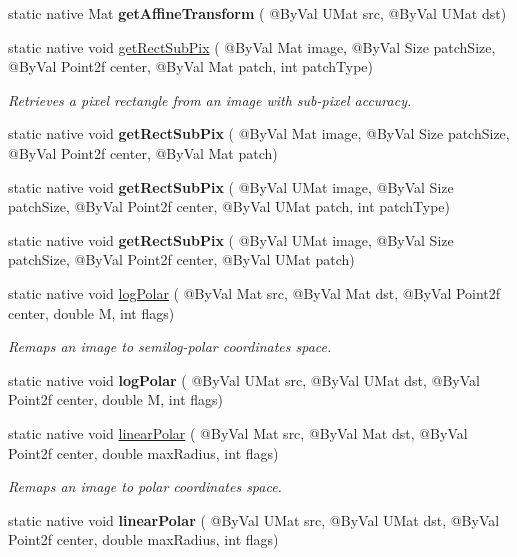 \begin{DoxyCompactItemize}
\item 
static native Mat {\bfseries get\+Affine\+Transform} ( @By\+Val U\+Mat src, @By\+Val U\+Mat dst)
\item 
static native void \hyperlink{group__imgproc__transform_gae176a226575415412c0b6ea67126e54e}{get\+Rect\+Sub\+Pix} ( @By\+Val Mat image, @By\+Val Size patch\+Size, @By\+Val Point2f center, @By\+Val Mat patch, int patch\+Type)
\begin{DoxyCompactList}\small\item\em Retrieves a pixel rectangle from an image with sub-\/pixel accuracy. \end{DoxyCompactList}\item 
static native void {\bfseries get\+Rect\+Sub\+Pix} ( @By\+Val Mat image, @By\+Val Size patch\+Size, @By\+Val Point2f center, @By\+Val Mat patch)
\item 
static native void {\bfseries get\+Rect\+Sub\+Pix} ( @By\+Val U\+Mat image, @By\+Val Size patch\+Size, @By\+Val Point2f center, @By\+Val U\+Mat patch, int patch\+Type)
\item 
static native void {\bfseries get\+Rect\+Sub\+Pix} ( @By\+Val U\+Mat image, @By\+Val Size patch\+Size, @By\+Val Point2f center, @By\+Val U\+Mat patch)
\item 
static native void \hyperlink{group__imgproc__transform_ga525e11d8b35ba086ca22b5ea9307c6a7}{log\+Polar} ( @By\+Val Mat src, @By\+Val Mat dst, @By\+Val Point2f center, double M, int flags)
\begin{DoxyCompactList}\small\item\em Remaps an image to semilog-\/polar coordinates space. \end{DoxyCompactList}\item 
static native void {\bfseries log\+Polar} ( @By\+Val U\+Mat src, @By\+Val U\+Mat dst, @By\+Val Point2f center, double M, int flags)
\item 
static native void \hyperlink{group__imgproc__transform_ga46939c6aff509b593336b89237a563d3}{linear\+Polar} ( @By\+Val Mat src, @By\+Val Mat dst, @By\+Val Point2f center, double max\+Radius, int flags)
\begin{DoxyCompactList}\small\item\em Remaps an image to polar coordinates space. \end{DoxyCompactList}\item 
static native void {\bfseries linear\+Polar} ( @By\+Val U\+Mat src, @By\+Val U\+Mat dst, @By\+Val Point2f center, double max\+Radius, int flags)
\item 

\end{DoxyCompactItemize}
